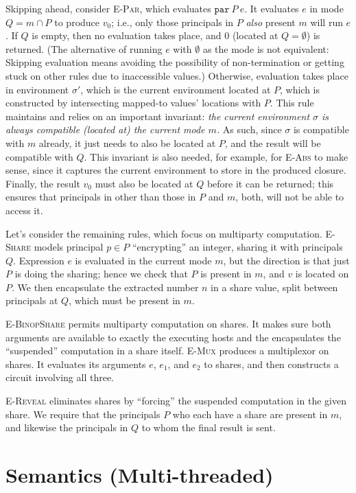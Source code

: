 \documentclass[10pt]{article}
\newcommand{\rulelab}[1]{{\small \textsc{#1}}}
\newcommand{\kw}[1]{\ensuremath{\mathtt{#1}}}
\newcommand{\epar}[2]{\ensuremath{\kw{par}~{#1}~{#2}}}
\begin{document}
Skipping ahead, consider \rulelab{E-Par}, which evaluates
$\epar{P}{e}$. It evaluates $e$ in mode $Q = m \cap P$ to produce
$v_0$; i.e., only those principals in $P$ \emph{also} present $m$ will
run $e$. If $Q$ is empty, then no evaluation takes place, and $0$
(located at $Q = \emptyset$) is
returned. (The alternative of running $e$ with $\emptyset$ as the mode
is not equivalent: Skipping evaluation means avoiding the possibility
of non-termination or getting stuck on other rules due to inaccessible
values.) Otherwise, evaluation takes place in environment $\sigma'$,
which is the current environment located at $P$, which is constructed
by intersecting mapped-to values' locations with $P$. This rule
maintains and relies on an important invariant: \emph{the current
  environment $\sigma$ is always compatible (located at) the current
  mode $m$.} As such, since $\sigma$ is compatible with $m$ already,
it just needs to also be located at $P$, and the result will be
compatible with $Q$. This invariant is also needed, for example, for
\rulelab{E-Abs} to make sense, since it captures the current
environment to store in the produced closure. Finally, the result
$v_0$ must also be located at $Q$ before it can be returned; this
ensures that principals in other than those in $P$ and $m$, both, will
not be able to access it.

Let's consider the remaining rules, which focus on multiparty
computation. \rulelab{E-Share} models principal $p \in P$
``encrypting'' an integer, sharing it with principals $Q$. Expression
$e$ is evaluated in the current mode $m$, but the direction is that
just $P$ is doing the sharing; hence we check that $P$ is present in
$m$, and $v$ is located
on $P$. We then encapsulate the extracted number $n$ in a share value,
split between principals at $Q$, which must be present in $m$.

\rulelab{E-BinopShare} permits multiparty computation on shares. It
makes sure both arguments are available to exactly the executing hosts
and the encapsulates the ``suspended'' computation in a share
itself. \rulelab{E-Mux} produces a multiplexor on shares. It evaluates
its arguments $e$, $e_1$, and $e_2$ to shares, and then constructs a
circuit involving all three.

\rulelab{E-Reveal} eliminates shares by ``forcing'' the suspended
computation in the given share. We require that the principals $P$ who
each have a share are present in $m$, and likewise the principals in
$Q$ to whom the final result is sent.

\section{Semantics (Multi-threaded)}
\end{document}

